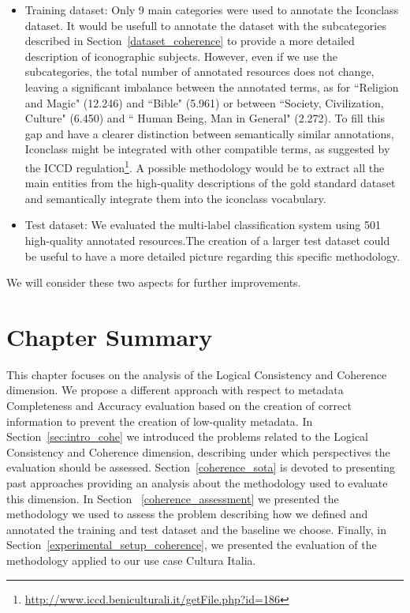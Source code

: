 \documentclass[epsfig,a4paper,12pt,titlepage]{book}
\begin{document}
\begin{itemize}
    \item Training dataset: Only 9 main categories were used to annotate the Iconclass dataset. It would be usefull to annotate the dataset with the subcategories described in Section~\ref{dataset_coherence} to provide a more detailed description of iconographic subjects. 
    However, even if we use the subcategories, the total number of annotated resources does not change, leaving a significant imbalance between the annotated terms, as for ``Religion and Magic" (12.246) and ``Bible" (5.961) or between ``Society, Civilization, Culture" (6.450) and `` Human Being, Man in General" (2.272). To fill this gap and have a clearer distinction between semantically similar annotations, Iconclass might be integrated with other compatible terms, as suggested by the ICCD regulation\footnote{\url{http://www.iccd.beniculturali.it/getFile.php?id=186}}. A possible methodology would be to extract all the main entities from the high-quality descriptions of the gold standard dataset and semantically integrate them into the iconclass vocabulary.
    \item Test dataset: We evaluated the multi-label classification system using 501 high-quality annotated resources.The creation of a larger test dataset could be useful to have a more detailed picture regarding this specific methodology.
\end{itemize}

We will consider these two aspects for further improvements.
\color{black}

\section{Chapter Summary}
This chapter focuses on the analysis of the Logical Consistency and Coherence dimension. We propose a different approach with respect to metadata Completeness and Accuracy evaluation based on the creation of correct information to prevent the creation of low-quality metadata. In Section~\ref{sec:intro_cohe} we introduced the problems related to the Logical Consistency and Coherence dimension, describing under which perspectives the evaluation should be assessed.  Section~\ref{coherence_sota} is devoted to presenting past approaches providing an analysis about the methodology used to evaluate this dimension. In Section ~\ref{coherence_assessment} we presented the methodology we used to assess the problem describing how we defined and annotated the training and test dataset and the baseline we choose. Finally, in Section~\ref{experimental_setup_coherence}, we presented the evaluation of the methodology applied to our use case Cultura Italia.
\end{document}
